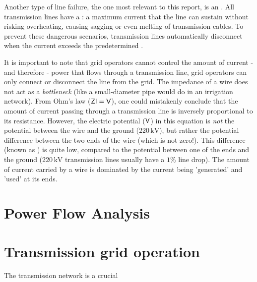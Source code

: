 \documentclass[main.tex]{subfiles}
\begin{document}
Another type of line failure, the one most relevant to this report, is an . All transmission lines have a : a maximum current that the line can sustain without risking overheating, causing sagging or even melting of transmission cables. To prevent these dangerous scenarios, transmission lines automatically disconnect when the current exceeds the predetermined . 

It is important to note that grid operators cannot control the amount of current - and therefore - power that flows through a transmission line, grid operators can only connect or disconnect the line from the grid. The impedance of a wire does not act as a \emph{bottleneck} (like a small-diameter pipe would do in an irrigation network). From Ohm's law ($\mathsf{ZI=V}$), one could mistakenly conclude that the amount of current passing through a transmission line is inversely proportional to its resistance. However, the electric potential ($\mathsf{V}$) in this equation is \emph{not} the potential between the wire and the ground (\eg $220\,\si{\kilo\volt}$), but rather the potential difference between the two ends of the wire (which is not zero!). This difference (known as ) is quite low, compared to the potential between one of the ends and the ground ($220\,\si{\kilo\volt}$ transmission lines usually have a $1\si{\percent}$ line drop). The amount of current carried by a wire is dominated by the current being 'generated' and 'used' at its ends.







\section{Power Flow Analysis}\label{sec:powerflow}

\section{Transmission grid operation}
The transmission network is a crucial 
\end{document}
